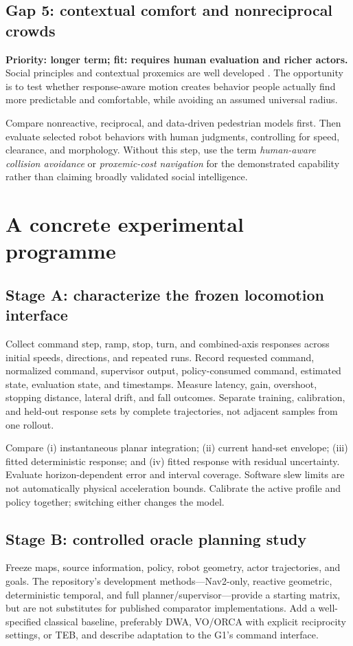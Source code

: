 \documentclass[11pt,a4paper]{article}
\begin{document}
\subsection{Gap 5: contextual comfort and nonreciprocal crowds}
\label{gap:comfort}
\textbf{Priority: longer term; fit: requires human evaluation and richer
actors.} Social principles and contextual proxemics are well developed
\citep{guidelines,proxemics2026}. The opportunity is to test whether
response-aware motion creates behavior people actually find more
predictable and comfortable, while avoiding an assumed universal radius.

Compare nonreactive, reciprocal, and data-driven pedestrian models first.
Then evaluate selected robot behaviors with human judgments, controlling
for speed, clearance, and morphology. Without this step, use the term
\emph{human-aware collision avoidance} or \emph{proxemic-cost navigation}
for the demonstrated capability rather than claiming broadly validated
social intelligence.

\section{A concrete experimental programme}
\label{sec:experiments}
\subsection{Stage A: characterize the frozen locomotion interface}
Collect command step, ramp, stop, turn, and combined-axis responses across
initial speeds, directions, and repeated runs. Record requested command,
normalized command, supervisor output, policy-consumed command, estimated
state, evaluation state, and timestamps. Measure latency, gain, overshoot,
stopping distance, lateral drift, and fall outcomes. Separate training,
calibration, and held-out response sets by complete trajectories, not
adjacent samples from one rollout.

Compare (i) instantaneous planar integration; (ii) current hand-set envelope;
(iii) fitted deterministic response; and (iv) fitted response with residual
uncertainty. Evaluate horizon-dependent error and interval coverage. Software
slew limits are not automatically physical acceleration bounds. Calibrate
the active profile and policy together; switching either changes the model.

\subsection{Stage B: controlled oracle planning study}
Freeze maps, source information, policy, robot geometry, actor trajectories,
and goals. The repository's development methods---Nav2-only, reactive
geometric, deterministic temporal, and full planner/supervisor---provide a
starting matrix, but are not substitutes for published comparator
implementations. Add a well-specified classical baseline, preferably DWA,
VO/ORCA with explicit reciprocity settings, or TEB, and describe adaptation
to the G1's command interface.
\end{document}

